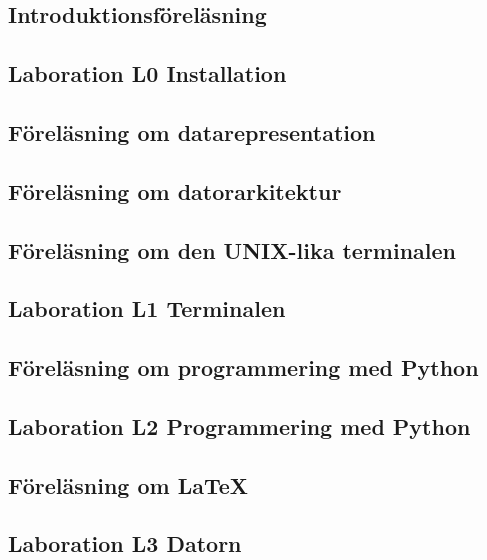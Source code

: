\documentclass[a4paper,logo]{miunart}
\begin{document}
\subsection{Introduktionsföreläsning}


\subsection{Laboration L0 Installation}


\subsection{Föreläsning om datarepresentation}


\subsection{Föreläsning om datorarkitektur}


\subsection{Föreläsning om den UNIX-lika terminalen}


\subsection{Laboration L1 Terminalen}


\subsection{Föreläsning om programmering med Python}


\subsection{Laboration L2 Programmering med Python}


\subsection{Föreläsning om LaTeX}


\subsection{Laboration L3 Datorn}

\end{document}
